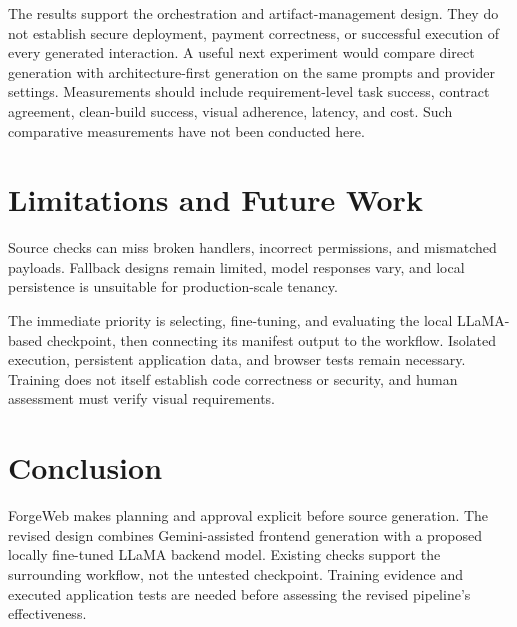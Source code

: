 \documentclass[conference,a4paper]{IEEEtran}
\begin{document}
The results support the orchestration and artifact-management design. They do not establish secure deployment, payment correctness, or successful execution of every generated interaction. A useful next experiment would compare direct generation with architecture-first generation on the same prompts and provider settings. Measurements should include requirement-level task success, contract agreement, clean-build success, visual adherence, latency, and cost. Such comparative measurements have not been conducted here.

\section{Limitations and Future Work}
Source checks can miss broken handlers, incorrect permissions, and mismatched payloads. Fallback designs remain limited, model responses vary, and local persistence is unsuitable for production-scale tenancy.

The immediate priority is selecting, fine-tuning, and evaluating the local LLaMA-based checkpoint, then connecting its manifest output to the workflow. Isolated execution, persistent application data, and browser tests remain necessary. Training does not itself establish code correctness or security, and human assessment must verify visual requirements.

\section{Conclusion}
ForgeWeb makes planning and approval explicit before source generation. The revised design combines Gemini-assisted frontend generation with a proposed locally fine-tuned LLaMA backend model. Existing checks support the surrounding workflow, not the untested checkpoint. Training evidence and executed application tests are needed before assessing the revised pipeline's effectiveness.



\end{document}
